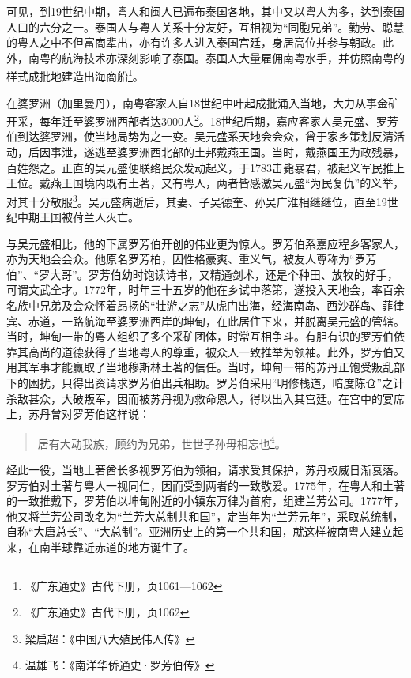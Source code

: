 可见，到19世纪中期，粤人和闽人已遍布泰国各地，其中又以粤人为多，达到泰国人口的六分之一。泰国人与粤人关系十分友好，互相视为“同胞兄弟”。勤劳、聪慧的粤人之中不但富商辈出，亦有许多人进入泰国宫廷，身居高位并参与朝政。此外，南粤的航海技术亦深刻影响了泰国。泰国人大量雇佣南粤水手，并仿照南粤的样式成批地建造出海商船\footnote{《广东通史》古代下册，页1061—1062}。

在婆罗洲（加里曼丹），南粤客家人自18世纪中叶起成批涌入当地，大力从事金矿开采，每年迁至婆罗洲西部者达3000人\footnote{《广东通史》古代下册，页1062}。18世纪后期，嘉应客家人吴元盛、罗芳伯到达婆罗洲，使当地局势为之一变。吴元盛系天地会会众，曾于家乡策划反清活动，后因事泄，遂逃至婆罗洲西北部的土邦戴燕王国。当时，戴燕国王为政残暴，百姓怨之。正直的吴元盛便联络民众发动起义，于1783击毙暴君，被起义军民推上王位。戴燕王国境内既有土著，又有粤人，两者皆感激吴元盛“为民复仇”的义举，对其十分敬服\footnote{梁启超：《中国八大殖民伟人传》}。吴元盛病逝后，其妻、子吴德奎、孙吴广淮相继继位，直至19世纪中期王国被荷兰人灭亡。

与吴元盛相比，他的下属罗芳伯开创的伟业更为惊人。罗芳伯系嘉应程乡客家人，亦为天地会会众。他原名罗芳柏，因性格豪爽、重义气，被友人尊称为“罗芳伯”、“罗大哥”。罗芳伯幼时饱读诗书，又精通剑术，还是个种田、放牧的好手，可谓文武全才。1772年，时年三十五岁的他在乡试中落第，遂投入天地会，率百余名族中兄弟及会众怀着昂扬的“壮游之志”从虎门出海，经海南岛、西沙群岛、菲律宾、赤道，一路航海至婆罗洲西岸的坤甸，在此居住下来，并脱离吴元盛的管辖。当时，坤甸一带的粤人组织了多个采矿团体，时常互相争斗。有胆有识的罗芳伯依靠其高尚的道德获得了当地粤人的尊重，被众人一致推举为领袖。此外，罗芳伯又用其军事才能赢取了当地穆斯林土著的信任。当时，坤甸一带的苏丹正饱受叛乱部下的困扰，只得出资请求罗芳伯出兵相助。罗芳伯采用“明修栈道，暗度陈仓”之计杀敌甚众，大破叛军，因而被苏丹视为救命恩人，得以出入其宫廷。在宫中的宴席上，苏丹曾对罗芳伯这样说：

\begin{quote}

居有大动我族，顾约为兄弟，世世子孙毋相忘也\footnote{温雄飞：《南洋华侨通史·罗芳伯传》}。
\end{quote}

经此一役，当地土著酋长多视罗芳伯为领袖，请求受其保护，苏丹权威日渐衰落。罗芳伯对土著与粤人一视同仁，因而受到两者的一致敬爱。1775年，在粤人和土著的一致推戴下，罗芳伯以坤甸附近的小镇东万律为首府，组建兰芳公司。1777年，他又将兰芳公司改名为“兰芳大总制共和国”，定当年为“兰芳元年”，采取总统制，自称“大唐总长”、“大总制”。亚洲历史上的第一个共和国，就这样被南粤人建立起来，在南半球靠近赤道的地方诞生了。

